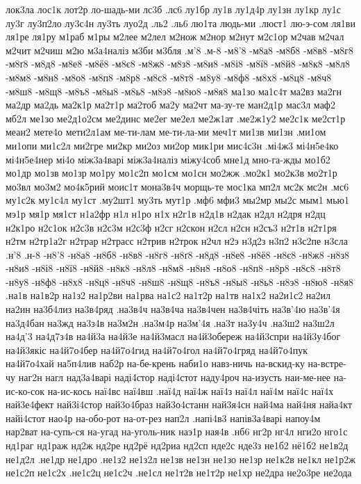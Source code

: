 {{лок3ла
лос1к
лот2р
ло-шадь-ми
лс3б
.лс6
лу1бр
лу1в
лу1д4р
лу1зн
лу1кр
лу1с
лу3г
лу3п2ло
лу3с4н
лу3ть
луо2д
.ль2
.ль6
лю1та
людь-ми
.люст1
лю-э-сом
ля1ви
ля1ре
ля1ру
м1раб
м1ры
м2лее
м2лел
м2нож
м2нор
м2нут
м2с1ор
м2чав
м2чал
м2чит
м2чиш
м2ю
м3а4наліз
м3би
м3бля
.м'8
.м-8
-м8'8
-м8а8
-м8б8
-м8в8
-м8г8
-м8ґ8
-м8д8
-м8е8
-м8ё8
-м8є8
-м8ж8
-м8з8
-м8и8
-м8і8
-м8ї8
-м8й8
-м8к8
-м8л8
-м8м8
-м8н8
-м8о8
-м8п8
-м8р8
-м8с8
-м8т8
-м8у8
-м8ф8
-м8х8
-м8ц8
-м8ч8
-м8ш8
-м8щ8
-м8ъ8
-м8ы8
-м8ь8
-м8э8
-м8ю8
-м8я8
ма1зо
ма1с4т
ма2вз
ма2гн
ма2др
ма2дь
ма2к1р
ма2т1р
ма2тоб
ма2у
ма2чт
ма-зу-те
ман2д1р
мас3л
маф2
мб2л
ме1зо
ме2д1о2см
ме2динс
ме2ег
ме2ел
ме2ж1ат
.ме2ж1у2
ме2с1к
ме2ст1р
меан2
мете4о
мети2л1ам
ме-ти-лам
ме-ти-ла-ми
меч1т
ми1зв
ми1зн
.ми1ом
ми1опи
ми1с2л
ми2гре
ми2кр
ми2оз
ми2ор
мик1ри
мис4с3н
.мі4ж3
мі4н5е4ко
мі4н5е4нер
мі4о
між3а4варі
між3а4наліз
міжу4соб
мне1д
мно-га-жды
мо1б2
мо1др
мо1зв
мо1зр
мо1ру
мо1с2п
мо1см
мо1сн
мо2жж
.мо2к1
мо2к3в
мо2т1р
мо3вл
мо3м2
мо4к5рий
моис1т
мона3в4ч
морщь-те
мос1ка
мп2л
мс2к
мс2н
.мс6
му1с2к
му1с4л
му1ст
.му2шт1
му3ть
мут1р
.мф6
мфи3
мы2мр
мы2с
мым1
мью1
мэ1р
мя1р
мя1ст
н1а2фр
н1л
н1ро
н1х
н2г1в
н2д1в
н2дак
н2дл
н2дря
н2дц
н2к1ро
н2с1ок
н2с3в
н2с3м
н2с3ф
н2сг
н2скон
н2сл
н2сн
н2съ3
н2т1в
н2т1ря
н2тм
н2тр1а2г
н2трар
н2трасс
н2трив
н2трок
н2чл
н2э
н3д2з
н3п2
н3с2пе
н3сла
.н'8
.н-8
-н8'8
-н8а8
-н8б8
-н8в8
-н8г8
-н8ґ8
-н8д8
-н8е8
-н8ё8
-н8є8
-н8ж8
-н8з8
-н8и8
-н8і8
-н8ї8
-н8й8
-н8к8
-н8л8
-н8м8
-н8н8
-н8о8
-н8п8
-н8р8
-н8с8
-н8т8
-н8у8
-н8ф8
-н8х8
-н8ц8
-н8ч8
-н8ш8
-н8щ8
-н8ъ8
-н8ы8
-н8ь8
-н8э8
-н8ю8
-н8я8
.на1в
на1в2р
на1з2
на1р2ви
на1рва
на1с2
на1т2р
на1тв
на1х2
на2и1с2
на2ил
на2ин
на3б4лиз
на3в4ряд
.на3в4ч
на3в4ча
на3в4чен
на3в4чіть
на3в'4ю
на3в'4я
на3д4бан
на3жд
на3з4в
на3м2н
.на3м4р
на3м'4я
.на3т
на3у4ч
.на3ш2
на3ш2л
на4д'3
на4д7з4в
на4й3а
на4й3е
на4й3масл
на4й3обереж
на4й3спри
на4й3у4бог
на4й3якіс
на4й7о4бер
на4й7о4гид
на4й7о4гол
на4й7о4гряд
на4й7о4пук
на4й7о4хай
на5п4лив
наб2р
на-бе-крень
наби1о
навз-ничь
на-вскид-ку
на-встре-чу
наг2н
нагл
над3а4варі
наді4стор
наді4стот
наду4роч
на-изусть
наи-ме-нее
на-ис-ко-сок
на-ис-кось
наї4вс
наї4вш
.наї4д
наї4ж
наї4з
наї4л
наї4м
наї4с
наї4х
най3е4фект
най3і4стор
най3о4браз
най3о4станн
най3я4сн
най4ма
най4ня
найа4кт
найі4стот
нао4р
на-обо-рот
на-от-рез
нап2л
.напі4в3
напів3а4варі
напоу4м
нар2ват
на-супь-ся
на-угад
на-уголь-ник
наэ1р
ная4в
.нб6
нг2р
нг4л
нги2о
нго1с
нд1раг
нд1раж
нд2ж
нд2ре
нд2рё
нд2риа
нд2сп
нде2с
нде3з
не1б2
нё1б2
не1в2д
не1д2л
.не1др
не1дро
.не1з2
не1з2л
не1зв
не1зн
не1зо
не1зр
не1к2в
не1кл
не1р2ж
не1с2п
не1с2х
.не1с2ц
не1с2ч
.не1сл
не1т2в
не1т2р
не1хр
не2дра
не2о3ре
не2ода
}}
